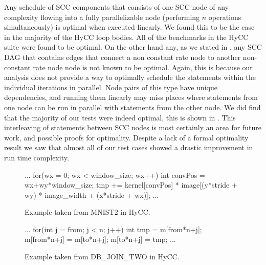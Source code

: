 Any schedule of SCC components that consists of one SCC node of any complexity flowing into a fully 
parallelizable node (performing $n$ operations simultaneously) is optimal when executed linearly. We found this
to be the case in the majority of the HyCC loop bodies. All of the benchmarks in the HyCC suite were found to be optimal.
On the other hand any, as we stated in , any SCC DAG that contains edges 
that connect a non constant rate node to another non-constant rate node node is not known to be optimal. 
Again, this is because our analysis does not provide a way to optimally schedule the statements within the 
individual iterations in parallel. Node pairs of this type have unique dependencies, and running them linearly may miss 
places where statements from one node can be run in parallel with statements from the other
node. We did find that the majority of our tests were indeed optimal, this is shown in
. This interleaving of statements between SCC nodes is most certainly an area 
for future work, and possible proofs for optimality. Despite a lack of a formal optimality result we saw
that almost all of our test cases showed a drastic improvement in run time complexity.



\begin{figure}[h]
\centering
\begin{minipage}{0.70\textwidth}
\begin{javacode}
...
for(wx = 0; wx < window_size; wx++) {
    int convPos = wx+wy*window_size;
    tmp += kernel[convPos] 
    	* image[(y*stride + wy) 
    	* image_width 
    	+ (x*stride + wx)];
}
...
\end{javacode}
\end{minipage}
\caption{Example taken from MNIST2 in HyCC. %
}
\label{fig:MNIST2HyCC}
\end{figure}

\begin{figure}[h]
\centering
\begin{minipage}{0.70\textwidth}
\begin{javacode}
...
for(int j = from; j < n; j++) {
    int tmp = m[from*n+j];
    m[from*n+j] = m[to*n+j];
    m[to*n+j] = tmp;
}
...
\end{javacode}
\end{minipage}
\caption{Example taken from DB_JOIN_TWO in HyCC. %
}
\label{fig:DBJOINTWO1HyCC}
\end{figure}


